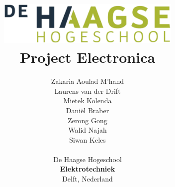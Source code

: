 \title{
\includegraphics[width=3.5in]{IMG/HHS.png} \\
\vspace*{1in}
\textbf{Project Electronica}}
\author{
  Zakaria Aoulad M'hand\\
  Laurens van der Drift\\
  Mietek Kolenda\\
  Daniël Braber\\
  Zerong Gong\\
  Walid Najah\\
  Siwan Keles\\
		\vspace*{0.5in} \\
		De Haagse Hogeschool\\
        \textbf{Elektrotechniek}\\
        Delft, Nederland
       } 